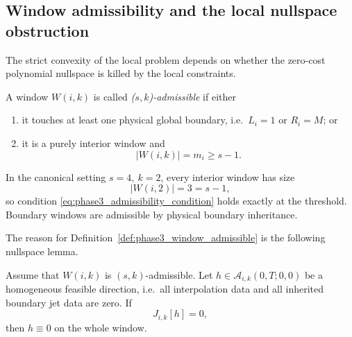 \subsection{Window admissibility and the local nullspace obstruction}
\label{subsec:phase3_window_admissibility}

The strict convexity of the local problem depends on whether the zero-cost polynomial nullspace is killed by the local constraints.

\begin{definition}
\label{def:phase3_window_admissible}
A window \(W(i,k)\) is called \emph{(\(s,k\))-admissible} if either
\begin{enumerate}
    \item it touches at least one physical global boundary, i.e.\ \(L_i=1\) or \(R_i=M\); or
    \item it is a purely interior window and
    \begin{equation}
    \label{eq:phase3_admissibility_condition}
    |W(i,k)|=m_i\ge s-1.
    \end{equation}
\end{enumerate}
\end{definition}

\begin{remark}
\label{rem:phase3_canonical_admissibility}
In the canonical setting \(s=4,\ k=2\), every interior window has size
\[
|W(i,2)|=3=s-1,
\]
so condition \eqref{eq:phase3_admissibility_condition} holds exactly at the threshold.
Boundary windows are admissible by physical boundary inheritance.
\end{remark}

The reason for Definition~\ref{def:phase3_window_admissible} is the following nullspace lemma.

\begin{lemma}
\label{lem:phase3_nullspace}
Assume that \(W(i,k)\) is \((s,k)\)-admissible.
Let \(h\in \mathcal A_{i,k}(0,T;0,0)\) be a homogeneous feasible direction, i.e.\ all interpolation data and all inherited boundary jet data are zero.
If
\begin{equation}
\label{eq:phase3_zero_cost}
J_{i,k}[h]=0,
\end{equation}
then \(h\equiv 0\) on the whole window.
\end{lemma}

